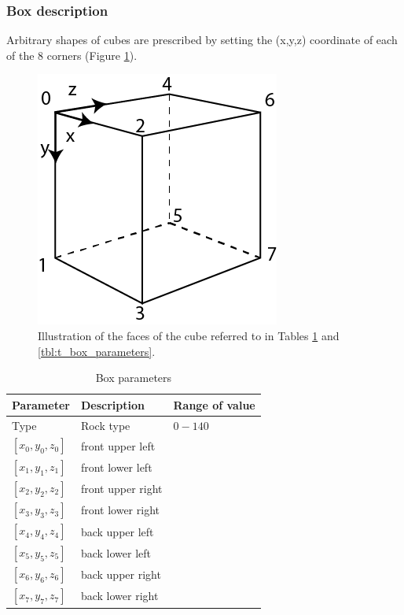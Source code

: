 \subsubsection{Box description}
Arbitrary shapes of cubes are prescribed by setting the (x,y,z) coordinate of each of the 8 corners (Figure \ref{fig:cube}).

\begin{figure}
    \centering
    \includegraphics{Illustrations/i3elviscube.png}
    \caption{Illustration of the faces of the cube referred to in Tables \ref{tbl:box_parameters} and \ref{tbl:t_box_parameters}.}
    \label{fig:cube}
\end{figure}

\begin{table}[H]
\centering
\begin{tabular}{l l l}
\toprule
Parameter		& Description			& Range of value \\
\midrule
Type			& Rock type				& $0-140$\\
$[x_0,y_0,z_0]$ & front upper left\\ 
$[x_1,y_1,z_1]$ & front lower left \\  
$[x_2,y_2,z_2]$ & front upper right \\ 
$[x_3,y_3,z_3]$ & front lower right \\ 
$[x_4,y_4,z_4]$ & back upper left \\  
$[x_5,y_5,z_5]$ & back lower left \\ 
$[x_6,y_6,z_6]$ & back upper right \\  
$[x_7,y_7,z_7]$ & back lower right \\ 
\bottomrule
\end{tabular}
\caption{Box parameters}
\label{tbl:box_parameters}
\end{table}

